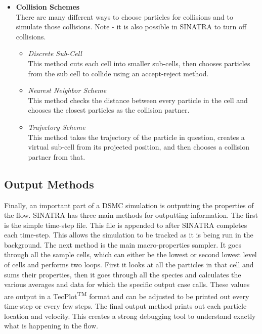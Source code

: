 \begin{itemize}
    
    \item \textbf{Collision Schemes} \\
    There are many different ways to choose particles for collisions and to simulate those collisions. Note - it is also possible in SINATRA to turn off collisions.
    \begin{itemize}
        \item \textit{Discrete Sub-Cell}\\
        This method cuts each cell into smaller sub-cells, then chooses particles from the sub cell to collide using an accept-reject method. 
        \item \textit{Nearest Neighbor Scheme}\\
        This method checks the distance between every particle in the cell and chooses the closest particles as the collision partner.
        \item \textit{Trajectory Scheme}\\
        This method takes the trajectory of the particle in question, creates a virtual sub-cell from its projected position, and then chooses a collision partner from that. 
    \end{itemize}
\end{itemize}


\subsection{Output Methods}
\label{sec:output}

Finally, an important part of a DSMC simulation is outputting the properties of the flow. SINATRA has three main methods for outputting information. The first is the simple time-step file. This file is appended to after SINATRA completes each time-step. This allows the simulation to be tracked as it is being run in the background. The next method is the main macro-properties sampler. It goes through all the sample cells, which can either be the lowest or second lowest level of cells and performs two loops. First it looks at all the particles in that cell and sums their properties, then it goes through all the species and calculates the various averages and data for which the specific output case calls. These values are output in a TecPlot\textsuperscript{TM} format and can be adjusted to be printed out every time-step or every few steps. The final output method prints out each particle location and velocity. This creates a strong debugging tool to understand exactly what is happening in the flow. 